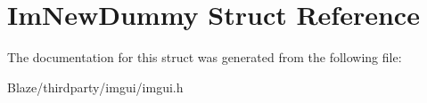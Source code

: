 \hypertarget{structImNewDummy}{}\section{Im\+New\+Dummy Struct Reference}
\label{structImNewDummy}


The documentation for this struct was generated from the following file\+:\begin{DoxyCompactItemize}
\item 
Blaze/thirdparty/imgui/imgui.\+h\end{DoxyCompactItemize}
